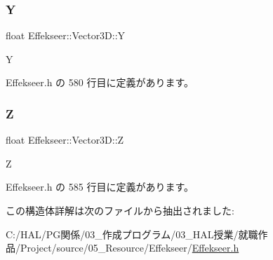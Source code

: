 \subsubsection{\texorpdfstring{Y}{Y}}
{\footnotesize\ttfamily float Effekseer\+::\+Vector3\+D\+::Y}



Y 



 Effekseer.\+h の 580 行目に定義があります。

\mbox{\label{struct_effekseer_1_1_vector3_d_aa73821e922d235f82cfb3d8eab43901a}} 
\subsubsection{\texorpdfstring{Z}{Z}}
{\footnotesize\ttfamily float Effekseer\+::\+Vector3\+D\+::Z}



Z 



 Effekseer.\+h の 585 行目に定義があります。



この構造体詳解は次のファイルから抽出されました\+:\begin{DoxyCompactItemize}
\item 
C\+:/\+H\+A\+L/\+P\+G関係/03\+\_\+作成プログラム/03\+\_\+\+H\+A\+L授業/就職作品/\+Project/source/05\+\_\+\+Resource/\+Effekseer/\mbox{\hyperlink{_effekseer_8h}{Effekseer.\+h}}\end{DoxyCompactItemize}
